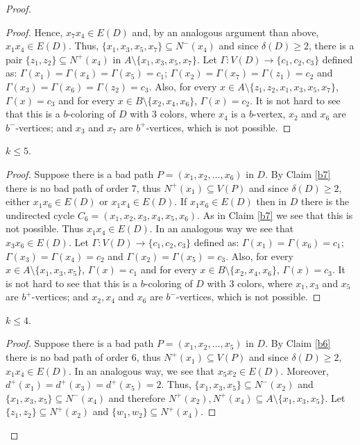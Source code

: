 \documentclass[10pt,a4paper]{amsart}
\begin{document}
\begin{proof}
\begin{proof}
Hence, $x_7x_4\in E(D)$ and, by an analogous argument than above, $x_1x_4\in E(D)$. Thus, $\{x_1, x_3, x_5, x_7\}\subseteq N^-(x_4)$ and since $\delta(D) \geq 2$, there is a pair $\{z_1, z_2\}\subseteq N^+(x_4)$ in $A\setminus\{x_1, x_3, x_5, x_7\}$. 
Let $\Gamma: V(D) \rightarrow \{c_1, c_2, c_3\}$ defined as: $\Gamma(x_1) = \Gamma(x_4)= \Gamma(x_5)= c_1$; $\Gamma(x_2) = \Gamma(x_7) =\Gamma(z_1) = c_2$ and $\Gamma(x_3) = \Gamma(x_6) = \Gamma(z_2) = c_3$. Also, for every $x\in A\setminus\{z_1, z_2, x_1, x_3, x_5, x_7\}$, $\Gamma(x) = c_3$ and for every $x\in B\setminus\{x_2, x_4, x_6\}$, $\Gamma(x) = c_2$. It is not hard to see that this is a $b$-coloring of $D$ with 3 colors, where $x_4$ is a $b$-vertex, $x_2$ and  $x_6$ are $b^-$-vertices; and $x_3$ and $x_7$ are $b^+$-vertices, which is not possible. 
\end{proof}


\begin{claim}\label{b6} $k\leq 5$.
\end{claim}
\begin{proof} Suppose there is a bad path $P=(x_1, x_2, \dots, x_6)$ in $D$. By Claim \ref{b7} there is no bad path of order $7$, thus $N^+(x_1) \subseteq V(P)$ and since $\delta(D) \geq 2$,  either $x_1x_6\in E(D)$ or $x_1x_4\in E(D)$. If $x_1x_6\in E(D)$ then in $D$ there is the undirected cycle $C_6= (x_1, x_2, x_3, x_4, x_5, x_6)$. As in Claim \ref{b7} we see that this is not possible. Thus  $x_1x_4\in E(D)$. In an analogous way we see that $x_3x_6\in E(D)$.  Let $\Gamma: V(D) \rightarrow \{c_1, c_2, c_3\}$ defined as: $\Gamma(x_1) = \Gamma(x_6) = c_1$; $\Gamma(x_3) = \Gamma(x_4) = c_2$ and $\Gamma(x_2) = \Gamma(x_5) = c_3$. Also, for every $x\in A\setminus\{x_1, x_3, x_5\}$, $\Gamma(x) = c_1$ and for every $x\in B\setminus\{x_2, x_4, x_6\}$, $\Gamma(x) = c_3$. It is not hard to see that this is a $b$-coloring of $D$ with 3 colors, where $x_1, x_3$ and $x_5$ are $b^+$-vertices; and $x_2, x_4$ and $x_6$ are $b^-$-vertices, which is not possible. 
\end{proof}

\begin{claim}\label{b5} $k\leq 4$.
\end{claim}
\begin{proof} Suppose there is a bad path $P=(x_1, x_2, \dots, x_5)$ in $D$. By Claim \ref{b6} there is no bad path of order $6$, thus $N^+(x_1) \subseteq V(P)$ and since $\delta(D) \geq 2$,  $x_1x_4\in E(D)$. In an analogous way, we see that $x_5x_2\in E(D)$. Moreover, $d^+(x_1) = d^+(x_3) = d^+(x_5)=2$. Thus, $\{x_1, x_3, x_5\}\subseteq N^-(x_2)$ and $\{x_1, x_3, x_5\}\subseteq N^-(x_4)$ and therefore $N^+(x_2), N^+(x_4)\subseteq A\setminus \{x_1, x_3, x_5\}$. Let $\{z_1, z_2\}\subseteq N^+(x_2)$ and $\{w_1, w_2\}\subseteq N^+(x_4)$. 


\end{proof}
\end{proof}
\end{document}
